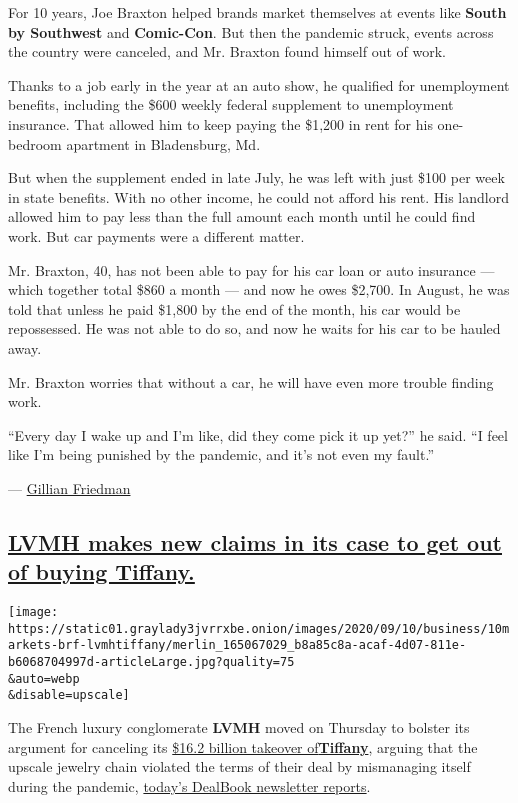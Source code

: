 For 10 years, Joe Braxton helped brands market themselves at events like
\textbf{South by Southwest} and \textbf{Comic-Con}. But then the
pandemic struck, events across the country were canceled, and Mr.
Braxton found himself out of work.

Thanks to a job early in the year at an auto show, he qualified for
unemployment benefits, including the \$600 weekly federal supplement to
unemployment insurance. That allowed him to keep paying the \$1,200 in
rent for his one-bedroom apartment in Bladensburg, Md.

But when the supplement ended in late July, he was left with just \$100
per week in state benefits. With no other income, he could not afford
his rent. His landlord allowed him to pay less than the full amount each
month until he could find work. But car payments were a different
matter.

Mr. Braxton, 40, has not been able to pay for his car loan or auto
insurance --- which together total \$860 a month --- and now he owes
\$2,700. In August, he was told that unless he paid \$1,800 by the end
of the month, his car would be repossessed. He was not able to do so,
and now he waits for his car to be hauled away.

Mr. Braxton worries that without a car, he will have even more trouble
finding work.

``Every day I wake up and I'm like, did they come pick it up yet?'' he
said. ``I feel like I'm being punished by the pandemic, and it's not
even my fault.''

--- \href{http://nytimes3xbfgragh.onion/by/gillian-friedman}{Gillian
Friedman}

\hypertarget{lvmh-makes-new-claims-in-its-case-to-get-out-of-buying-tiffany}{%
\subsection{\texorpdfstring{\protect\hyperlink{lvmh-makes-new-claims-in-its-case-to-get-out-of-buying-tiffany}{LVMH
makes new claims in its case to get out of buying
Tiffany.}}{LVMH makes new claims in its case to get out of buying Tiffany.}}\label{lvmh-makes-new-claims-in-its-case-to-get-out-of-buying-tiffany}}

\texttt{[image: https://static01.graylady3jvrrxbe.onion/images/2020/09/10/business/10markets-brf-lvmhtiffany/merlin\_165067029\_b8a85c8a-acaf-4d07-811e-b6068704997d-articleLarge.jpg?quality=75\\\&auto=webp\\\&disable=upscale]}

The French luxury conglomerate \textbf{LVMH} moved on Thursday to
bolster its argument for canceling its
\href{https://www.nytimes3xbfgragh.onion/2020/09/09/business/lvmh-tiffany-deal-lawsuit.html}{\$16.2
billion takeover
of}\textbf{\href{https://www.nytimes3xbfgragh.onion/2020/09/09/business/lvmh-tiffany-deal-lawsuit.html}{Tiffany}},
arguing that the upscale jewelry chain violated the terms of their deal
by mismanaging itself during the pandemic,
\href{https://www.nytimes3xbfgragh.onion/2020/09/10/business/dealbook/lvmh-tiffany-deal.html}{today's
DealBook newsletter reports}.

